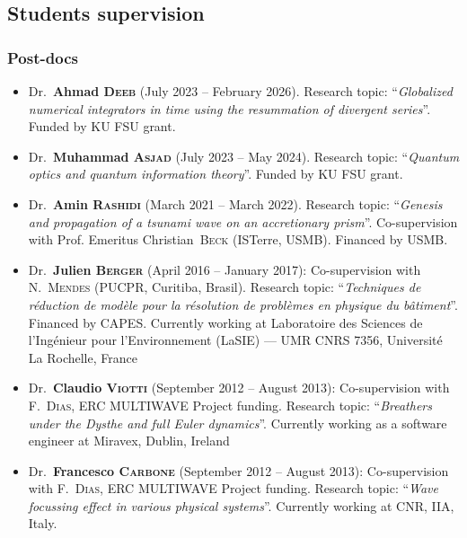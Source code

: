 \documentclass[final, a4paper, oneside, 12pt]{article}
\numberwithin{equation}{section}
\begin{document}
\subsection{Students supervision}

\subsubsection{Post-docs}

\begin{itemize}

  \item Dr.~\textbf{Ahmad \textsc{Deeb}} (July 2023 -- February 2026). Research topic: ``\textit{Globalized numerical integrators in time using the resummation of divergent series}''. Funded by KU FSU grant.

  \item Dr.~\textbf{Muhammad \textsc{Asjad}} (July 2023 -- May 2024). Research topic: ``\textit{Quantum optics and quantum information theory}''. Funded by KU FSU grant.

  \item Dr.~\textbf{Amin \textsc{Rashidi}} (March 2021 -- March 2022). Research topic: ``\textit{Genesis and propagation of a tsunami wave on an accretionary prism}''. Co-supervision with Prof. Emeritus Christian~\textsc{Beck} (ISTerre, USMB). Financed by USMB.

  \item Dr.~\textbf{Julien \textsc{Berger}} (April 2016 -- January 2017): Co-supervision with N.~\textsc{Mendes} (PUCPR, Curitiba, Brasil). Research topic: ``\textit{Techniques de r\'eduction de mod\`ele pour la r\'esolution de probl\`emes en physique du b\^atiment}''. Financed by CAPES. Currently working at Laboratoire des Sciences de l'Ing\'enieur pour l'Environnement (LaSIE) --- UMR CNRS 7356, Universit\'e La Rochelle, France
  
  \item Dr.~\textbf{Claudio \textsc{Viotti}} (September 2012 -- August 2013): Co-supervision with F.~\textsc{Dias}, ERC MULTIWAVE Project funding. Research topic: ``\textit{Breathers under the Dysthe and full Euler dynamics}''. Currently working as a software engineer at Miravex, Dublin, Ireland
  
  \item Dr.~\textbf{Francesco \textsc{Carbone}} (September 2012 -- August 2013): Co-supervision with F.~\textsc{Dias}, ERC MULTIWAVE Project funding. Research topic: ``\textit{Wave focussing effect in various physical systems}''. Currently working at CNR, IIA, Italy.

\end{itemize}
\end{document}
